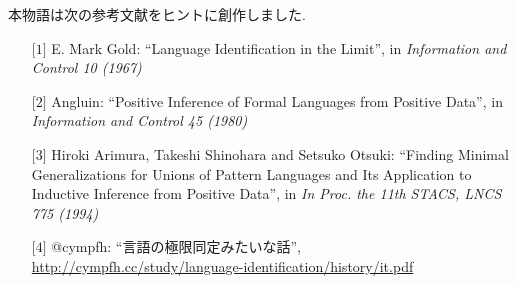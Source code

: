 本物語は次の参考文献をヒントに創作しました.

\begin{enumerate}
    \item[$\lbrack 1 \rbrack$] E. Mark Gold: ``Language Identification in the Limit'', in \emph{Information and Control 10 (1967)}
    \item[$\lbrack 2 \rbrack$] Angluin: ``Positive Inference of Formal Languages from Positive Data'', in \emph{Information and Control 45 (1980)}
    \item[$\lbrack 3 \rbrack$] {Hiroki Arimura, Takeshi Shinohara and Setsuko Otsuki}: ``{Finding Minimal Generalizations for Unions of Pattern Languages and Its Application to Inductive Inference from Positive Data}'', in \emph{In Proc. the 11th STACS, LNCS 775 (1994)}
    \item[$\lbrack 4 \rbrack$] {\rm @cympfh}: ``言語の極限同定みたいな話'',\\
        \url{http://cympfh.cc/study/language-identification/history/it.pdf}
\end{enumerate}
